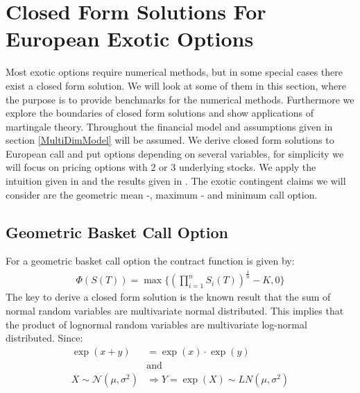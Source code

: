 \section{Closed Form Solutions For European Exotic Options}\label{ExoticEuro}
Most exotic options require numerical methods, but in some special cases there exist a closed form solution. We will look at some of them in this section, where the purpose is to provide benchmarks for the numerical methods. Furthermore we explore the boundaries of closed form solutions and show applications of martingale theory. Throughout the financial model and assumptions given in section \ref{MultiDimModel} will be assumed. We derive closed form solutions to European call and put options depending on several variables, for simplicity we will focus on pricing options with 2 or 3 underlying stocks. We apply the intuition given in \parencite{Johnson87} and the results given in \parencite{Ouwehand2006}. The exotic contingent claims we will consider are the geometric mean -, maximum - and minimum call option.

\subsection{Geometric Basket Call Option}\label{GeoBasket}
For a geometric basket call option the contract function is given by:
\begin{align*}
\Phi(S(T))=\max\{ (\prod_{i=1}^{n} S_i(T))^{\frac{1}{n}}-K,0 \}
\end{align*}
The key to  derive a closed form solution is the known result that the sum of normal random variables are multivariate normal distributed.
This implies that the product of lognormal random variables are multivariate log-normal distributed. Since: 
\begin{equation*}
\begin{split}
\exp(x+y)&=\exp(x)\cdot \exp(y) \\
& \text{and}\\
 X \sim \mathcal{N}(\mu,\sigma^2) & \Rightarrow Y = \exp(X)\sim LN(\mu, \sigma^2)
\end{split}
\end{equation*}


